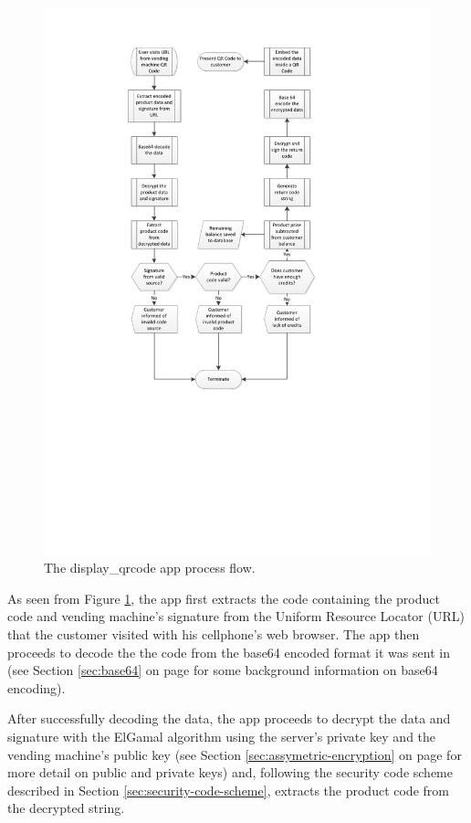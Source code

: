 \begin{figure}
 \centering 
 \includegraphics[clip=true, trim = 0 250 0 50,
 scale=0.7]{qrcode_processflow_server_bak}
 \caption{The display\_qrcode app process flow.}
 \label{fig:disp-qrcode}
\end{figure}

As seen from Figure \ref{fig:disp-qrcode}, the app first extracts the code containing the
product code and vending machine's signature from the Uniform Resource Locator (URL) that the
customer visited with his cellphone's web browser. The app then proceeds to decode the
the code from the base64 encoded format it was sent in (see Section \ref{sec:base64} on
page \pageref{sec:base64} for some background information on base64 encoding).

After successfully decoding the data, the app proceeds to decrypt the data and signature with the ElGamal
algorithm using the server's private key and the vending machine's public key
(see Section \ref{sec:assymetric-encryption} on page \pageref{sec:assymetric-encryption} for more detail on
public and private keys) and, following the security code scheme described in Section \ref{sec:security-code-scheme}, extracts the product
code from the decrypted string.

